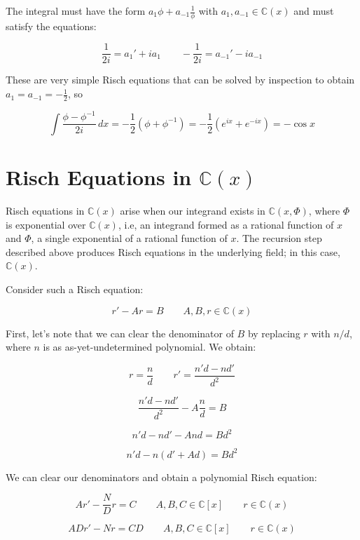 The integral must have the form $a_1 \phi + a_{-1} \frac{1}{\phi}$
with $a_1, a_{-1} \in {\mathbb C}(x)$ and must satisfy the equations:

$$\frac{1}{2i} = a_1' + i a_1 \qquad - \frac{1}{2i} = a_{-1}' - i a_{-1}$$ 

These are very simple Risch equations that can be solved by inspection
to obtain $a_1 = a_{-1} = -\frac{1}{2}$, so

$$\int \frac{\phi - \phi^{-1}}{2i} \,dx = -\frac{1}{2}(\phi + \phi^{-1})
 = -\frac{1}{2}(e^{ix} + e^{-ix}) = -\cos x$$

\endexample

\vfill\eject
\section{Risch Equations in ${\mathbb C}(x)$}

Risch equations in ${\mathbb C}(x)$ arise when our integrand exists in
${\mathbb C}(x,\Phi)$, where $\Phi$ is exponential over ${\mathbb
C}(x)$, i.e, an integrand formed as a rational function of $x$ and $\Phi$, a
single exponential of a rational function of $x$.  The recursion step
described above produces Risch equations in the underlying field;
in this case, ${\mathbb C}(x)$.

Consider such a Risch equation:

$$r' - A r = B \qquad A,B,r \in {\mathbb C}(x)$$

First, let's note that we can clear the denominator of $B$ by replacing
$r$ with $n/d$, where $n$ is as as-yet-undetermined polynomial.  We obtain:

\begin{comment}
$$r = nd \qquad r' = n d' + n' d$$

$$nd' + n' d - A n d = B$$

$$nd' + (n' - A n) d = B$$
\end{comment}

$$r = \frac{n}{d} \qquad r' = \frac{n' d - n d'}{d^2}$$

$$\frac{n' d - n d'}{d^2} - A \frac{n}{d} = B$$

$$n' d - n d' - A n d = B d^2$$

$$n' d - n (d' + A d) = B d^2$$

We can clear our denominators and obtain a polynomial Risch equation:

$$A r' - \frac{N}{D} r = C \qquad A,B,C \in {\mathbb C}[x] \qquad r \in {\mathbb C}(x)$$

$$A D r' - N r = C D \qquad A,B,C \in {\mathbb C}[x] \qquad r \in {\mathbb C}(x)$$

